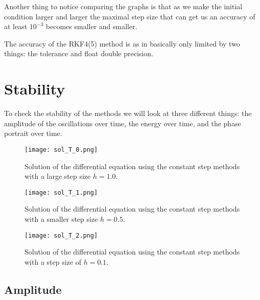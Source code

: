 \documentclass[10pt,a4paper,twocolumn]{article}
\begin{document}
Another thing to notice comparing the graphs is that as we make the initial condition larger and larger the maximal step size that can get us an accuracy of at least $10^{-3}$ becomes smaller and smaller.

The accuracy of the RKF4(5) method is as in \cite{me} basically only limited by two things: the tolerance and float double precision.


\section{Stability}

To check the stability of the methods we will look at three different things: the amplitude of the oscillations over time, the energy over time, and the phase portrait over time.


\begin{figure}
    \centering
    \captionsetup{justification=centering}
    \texttt{[image: sol\_T\_0.png]}
    \caption{Solution of the differential equation using the constant step methods with a large step size $h = 1.0$.}
    \label{fig:sol_T_0}
\end{figure}

\begin{figure}
    \centering
    \captionsetup{justification=centering}
    \texttt{[image: sol\_T\_1.png]}
    \caption{Solution of the differential equation using the constant step methods with a smaller step size $h = 0.5$.}
    \label{fig:sol_T_1}
\end{figure}

\begin{figure}
    \centering
    \captionsetup{justification=centering}
    \texttt{[image: sol\_T\_2.png]}
    \caption{Solution of the differential equation using the constant step methods with a step size of $h = 0.1$.}
    \label{fig:sol_T_2}
\end{figure}

\subsection{Amplitude}
\end{document}
